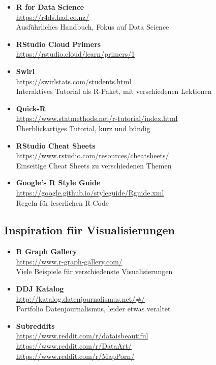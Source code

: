 \documentclass[11pt,german,a4paper]{article}
\begin{document}
\begin{itemize}
\item
  \textbf{R for Data Science}\\
  \url{https://r4ds.had.co.nz/}~\\
  Ausführliches Handbuch, Fokus auf Data Science
\item
  \textbf{RStudio Cloud Primers}\\
  \url{https://rstudio.cloud/learn/primers/1}
\item
  \textbf{Swirl}\\
  \url{https://swirlstats.com/students.html}~\\
  Interaktives Tutorial als R-Paket, mit verschiedenen Lektionen
\item
  \textbf{Quick-R}\\
  \url{https://www.statmethods.net/r-tutorial/index.html}~\\
  Überblickartiges Tutorial, kurz und bündig
\item
  \textbf{RStudio Cheat Sheets}\\
  \url{https://www.rstudio.com/resources/cheatsheets/}~\\
  Einseitige Cheat Sheets zu verschiedenen Themen
\item
  \textbf{Google's R Style Guide}\\
  \url{https://google.github.io/styleguide/Rguide.xml}~\\
  Regeln für leserlichen R Code
\end{itemize}

\hypertarget{inspiration-fuxfcr-visualisierungen}{%
\subsection*{Inspiration für Visualisierungen}\label{inspiration-fuxfcr-visualisierungen}}

\begin{itemize}
\item
  \textbf{R Graph Gallery}\\
  \url{https://www.r-graph-gallery.com/}~\\
  Viele Beispiele für verschiedenste Visualisierungen
\item
  \textbf{DDJ Katalog}\\
  \url{http://katalog.datenjournalismus.net/\#/}~\\
  Portfolio Datenjournalismus, leider etwas veraltet
\item
  \textbf{Subreddits}\\
  \url{https://www.reddit.com/r/dataisbeautiful}~\\
  \url{https://www.reddit.com/r/DataArt/}~\\
  \url{https://www.reddit.com/r/MapPorn/}
\end{itemize}
\end{document}

